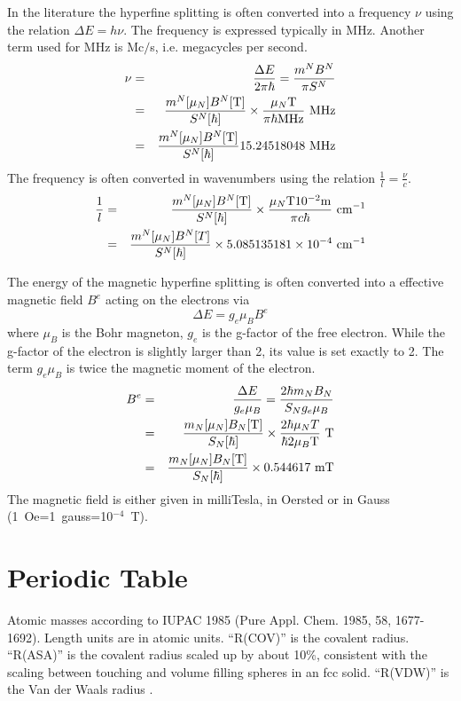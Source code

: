 \documentclass[final,12pt,makeidx,DIV=calc]{article}
\begin{document}
{{{In the literature the hyperfine splitting is often converted into a
frequency $\nu$ using the relation $\Delta E=h\nu$. The frequency is
expressed typically in MHz. Another term used for MHz is Mc$/$s, i.e.
megacycles per second.
\begin{eqnarray*}
\nu&=&\frac{\Delta E}{2\pi\hbar} 
=\frac{m^N B^N}{\pi S^N}
\\
&=&
\frac{m^N[\mu_N]B^N[{\rm T}]}{S^N[\hbar]}
\times\frac{\mu_N {\rm T}}{\pi \hbar {\rm MHz}}\ {\rm MHz}
\\
&=&\frac{m^N[\mu_N]B^N[{\rm T}]}{S^N[\hbar]} 15.24518048\ {\rm MHz}
\end{eqnarray*}
The frequency is often converted in wavenumbers using the relation
$\frac{1}{l}=\frac{\nu}{c}$.
\begin{eqnarray*}
\frac{1}{l}&=&
\frac{m^N[\mu_N]B^N[{\rm T}]}{S^N[\hbar]} \times\frac{\mu_N {\rm T}
  10^{-2}{\rm m}}{\pi c\hbar
  }\ {\rm cm}^{-1}
\\
&=&
\frac{m^N[\mu_N]B^N[T]}{S^N[\hbar]} \times 5.085135181\times 10^{-4}\ {\rm cm}^{-1}
\end{eqnarray*}


The energy of the magnetic hyperfine splitting is often converted into
a effective magnetic field $B^e$ acting on the electrons via
\begin{displaymath}
\Delta E=g_e\mu_B B^e
\end{displaymath}
where $\mu_B$ is the Bohr magneton, $g_e$ is the g-factor of the free
electron. While the g-factor of the electron is slightly larger than
2, its value is set exactly to 2. The term $g_e\mu_B$ is twice the
magnetic moment of the electron. 
\begin{eqnarray*}
B^e&=&\frac{\Delta E}{g_e\mu_B}=\frac{2\hbar m_N B_N}{S_N g_e\mu_B}
\\
&=&\frac{m_N[\mu_N]B_N[{\rm T}]}{S_N[\hbar]}\times 
\frac{2\hbar\mu_N T}{\hbar 2\mu_B {\rm T}}\ {\rm T} 
\\
&=& \frac{m_N[\mu_N]B_N[{\rm T}]}{S_N[\hbar]}\times 0.544617\ {\rm mT}
\end{eqnarray*}
The magnetic field is either given in
milliTesla, in Oersted or in Gauss (1~Oe=1~gauss=10$^{-4}$~T).

\newpage
\section{Periodic Table}
Atomic masses according to IUPAC 1985 (Pure Appl. Chem. 1985, 58,
1677-1692). Length units are in atomic units. ``R(COV)'' is the covalent radius.
``R(ASA)'' is the covalent radius scaled up by about 10\%, consistent
with the scaling between touching and volume filling spheres in an fcc
solid. ``R(VDW)'' is the Van der Waals radius \cite{rappe92_jacs114_10024}.

}}}
\end{document}
